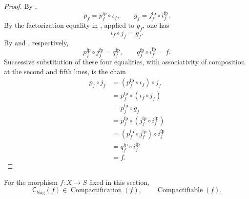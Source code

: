 \begin{proof}
  By ,
  \[
    p_f=p_f^{\mathrm{fp}}\circ\iota_f,
    \qquad
    g_f=j_f^{\mathrm{fp}}\circ i_f^{\mathrm{fp}}.
  \]
  By the factorization equality in
  , applied to $g_f$, one has
  \[
    \iota_f\circ j_f=g_f.
  \]
  By  and
  , respectively,
  \[
    p_f^{\mathrm{fp}}\circ j_f^{\mathrm{fp}}=q_f^{\mathrm{fp}},
    \qquad
    q_f^{\mathrm{fp}}\circ i_f^{\mathrm{fp}}=f.
  \]
  Successive substitution of these four equalities, with associativity of
  composition at the second and fifth lines, is the chain
  \[
  \begin{aligned}
    p_f\circ j_f
      &=(p_f^{\mathrm{fp}}\circ\iota_f)\circ j_f\\
      &=p_f^{\mathrm{fp}}\circ(\iota_f\circ j_f)\\
      &=p_f^{\mathrm{fp}}\circ g_f\\
      &=p_f^{\mathrm{fp}}\circ
        (j_f^{\mathrm{fp}}\circ i_f^{\mathrm{fp}})\\
      &=(p_f^{\mathrm{fp}}\circ j_f^{\mathrm{fp}})
        \circ i_f^{\mathrm{fp}}\\
      &=q_f^{\mathrm{fp}}\circ i_f^{\mathrm{fp}}\\
      &=f.
  \end{aligned}
  \]
\end{proof}

\begin{theorem}
  \label{thm:nagata-compactification}
\checked
  For the morphism $f\colon X\to S$ fixed in this section,
  \[
    \mathsf C_{\mathrm{Nag}}(f)
      \in\operatorname{Compactification}(f),
    \qquad
    \operatorname{Compactifiable}(f).
  \]
\end{theorem}

